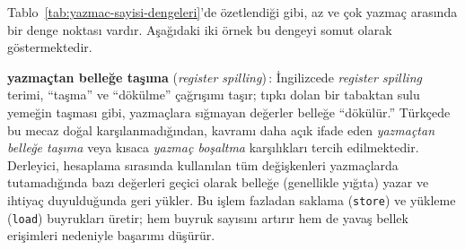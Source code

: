 Tablo~\ref{tab:yazmac-sayisi-dengeleri}'de özetlendiği gibi, az ve çok yazmaç arasında bir denge noktası vardır. Aşağıdaki iki örnek bu dengeyi somut olarak göstermektedir.

\begin{terimnotu}
\textbf{yazmaçtan belleğe taşıma} (\emph{register spilling})\,: İngilizcede \emph{register spilling} terimi, ``taşma'' ve ``dökülme'' çağrışımı taşır; tıpkı dolan bir tabaktan sulu yemeğin taşması gibi, yazmaçlara sığmayan değerler belleğe ``dökülür.'' Türkçede bu mecaz doğal karşılanmadığından, kavramı daha açık ifade eden \emph{yazmaçtan belleğe taşıma} veya kısaca \emph{yazmaç boşaltma} karşılıkları tercih edilmektedir. Derleyici, hesaplama sırasında kullanılan tüm değişkenleri yazmaçlarda tutamadığında bazı değerleri geçici olarak belleğe (genellikle yığıta) yazar ve ihtiyaç duyulduğunda geri yükler. Bu işlem fazladan saklama (\texttt{store}) ve yükleme (\texttt{load}) buyrukları üretir; hem buyruk sayısını artırır hem de yavaş bellek erişimleri nedeniyle başarımı düşürür.
\end{terimnotu}

